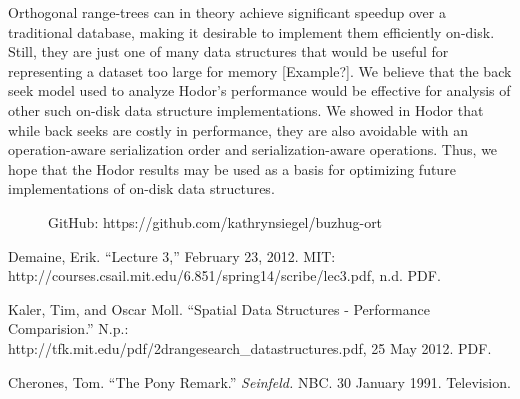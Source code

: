 \documentclass[11pt, oneside]{article}
\begin{document}
Orthogonal range-trees can in theory achieve significant speedup over a
traditional database, making it desirable to implement them efficiently
on-disk. Still, they are just one of many data structures that would be useful
for representing a dataset too large for memory [Example?]. We believe that the
back seek model used to analyze Hodor's performance would be effective for
analysis of other such on-disk data structure implementations. We showed in
Hodor that while back seeks are costly in performance, they are also avoidable
with an operation-aware serialization order and serialization-aware operations.
Thus, we hope that the Hodor results may be used as a basis for optimizing
future implementations of on-disk data structures. 

\begin{figure}[b]
    GitHub: https://github.com/kathrynsiegel/buzhug-ort
\end{figure}

\newpage

\begin{thebibliography}{1}
    
     Demaine, Erik. ``Lecture 3,'' February 23, 2012.  MIT: \\
        http://courses.csail.mit.edu/6.851/spring14/scribe/lec3.pdf, n.d. PDF.

     Kaler, Tim, and Oscar Moll. ``Spatial Data Structures -
        Performance Comparision.'' N.p.: \\
        http://tfk.mit.edu/pdf/2drangesearch\_datastructures.pdf, 25 May 2012.
        PDF.

     Cherones, Tom. ``The Pony Remark.'' \textit{Seinfeld.}
        NBC. 30 January 1991. Television.

\end{thebibliography}
\end{document}
